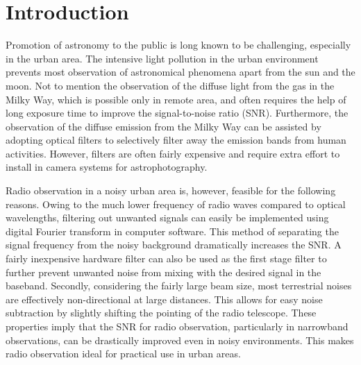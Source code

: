 \documentclass[12pt]{article}
\begin{document}
	
	\setcounter{page}{1}
	\setcounter{footnote}{0}

\newpage
	
	\tableofcontents
		
\newpage

	\section{Introduction}
    Promotion of astronomy to the public is long known to be challenging, especially in the urban area. 
    The intensive light pollution in the urban environment prevents most observation of astronomical phenomena apart from the sun and the moon.
    Not to mention the observation of the diffuse light from the gas in the Milky Way, which is possible only in remote area, and often requires the help of long exposure time to improve the signal-to-noise ratio (SNR).
    Furthermore, the observation of the diffuse emission from the Milky Way can be assisted by adopting optical filters to selectively filter away the emission bands from human activities. 
    However, filters are often fairly expensive and require extra effort to install in camera systems for astrophotography. 

    Radio observation in a noisy urban area is, however, feasible for the following reasons.
    Owing to the much lower frequency of radio waves compared to optical wavelengths, filtering out unwanted signals can easily be implemented using digital Fourier transform in computer software. This method of separating the signal frequency from the noisy background dramatically increases the SNR.
    A fairly inexpensive hardware filter can also be used as the first stage filter to further prevent unwanted noise from mixing with the desired signal in the baseband.
    Secondly, considering the fairly large beam size, most terrestrial noises are effectively non-directional at large distances. This allows for easy noise subtraction by slightly shifting the pointing of the radio telescope.
    These properties imply that the SNR for radio observation, particularly in narrowband observations, can be drastically improved even in noisy environments. This makes radio observation ideal for practical use in urban areas.
\end{document}
